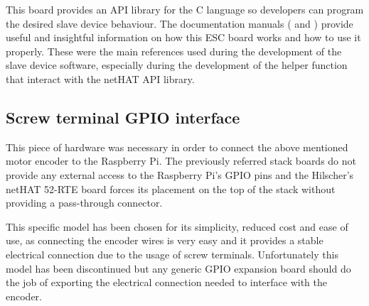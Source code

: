 This board provides an API library for the C language so developers can program the desired slave device behaviour.
The documentation manuals (\cite{nethat:cifx_api_docs} and \cite{nethat:ethercat_api_docs}) provide useful and insightful information on how this ESC board works and how to use it properly.
These were the main references used during the development of the slave device software, especially during the development of the helper function that interact with the netHAT API library.

\subsection{Screw terminal GPIO interface}
This piece of hardware was necessary in order to connect the above mentioned motor encoder to the Raspberry Pi.
The previously referred stack boards do not provide any external access to the Raspberry Pi's GPIO pins and the Hilscher's netHAT 52-RTE board forces its placement on the top of the stack without providing a pass-through connector.

This specific model has been chosen for its simplicity, reduced cost and ease of use, as connecting the encoder wires is very easy and it provides a stable electrical connection due to the usage of screw terminals.
Unfortunately this model has been discontinued but any generic GPIO expansion board should do the job of exporting the electrical connection needed to interface with the encoder.
